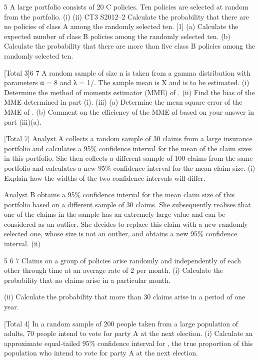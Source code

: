 \documentclass[a4paper,12pt]{article}
\begin{document}
\begin{enumerate}

5
A large portfolio consists of 20%
C policies. Ten policies are selected at random from the portfolio.
(i)
(ii)
CT3 S2012–2
Calculate the probability that there are no policies of class A among the
randomly selected ten.
[1]
(a) Calculate the expected number of class B policies among the randomly
selected ten.
(b) Calculate the probability that there are more than five class B policies
among the randomly selected ten.

[Total 3]6
7
A random sample of size n is taken from a gamma distribution with parameters α = 8
and λ = 1/\theta. The sample mean is X and \theta is to be estimated.
(i) Determine the method of moments estimator (MME) of \theta. 
(ii) Find the bias of the MME determined in part (i). 
(iii) (a) Determine the mean square error of the MME of \theta. (b) Comment on the efficiency of the MME of \theta based on your answer in
part (iii)(a).

[Total 7]
Analyst A collects a random sample of 30 claims from a large insurance portfolio and
calculates a 95\% confidence interval for the mean of the claim sizes in this portfolio.
She then collects a different sample of 100 claims from the same portfolio and
calculates a new 95\% confidence interval for the mean claim size.
(i)
Explain how the widths of the two confidence intervals will differ.

Analyst B obtains a 95\% confidence interval for the mean claim size of this portfolio
based on a different sample of 30 claims. She subsequently realises that one of the
claims in the sample has an extremely large value and can be considered as an outlier.
She decides to replace this claim with a new randomly selected one, whose size is not
an outlier, and obtains a new 95\% confidence interval.
(ii)

5
6
7
Claims on a group of policies arise randomly and independently of each other through
time at an average rate of 2 per month.
(i) Calculate the probability that no claims arise in a particular month.

(ii) Calculate the probability that more than 30 claims arise in a period of one
year.

[Total 4]
In a random sample of 200 people taken from a large population of adults, 70 people
intend to vote for party A at the next election.
(i) Calculate an approximate equal-tailed 95\% confidence interval for \theta, the true
proportion of this population who intend to vote for party A at the next
election.


\end{enumerate}
\end{document}
